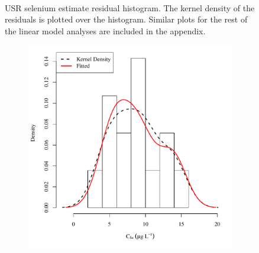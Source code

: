 \begin{landscape}
\begin{figure}
\begin{subfigure}{0.7\textwidth}
		\end{subfigure}\\
		\caption[USR selenium estimate residual histogram.]{USR selenium estimate residual histogram.  The kernel density of the residuals is plotted over the histogram.  Similar plots for the rest of the linear model analyses are included in the appendix.}
		\label{fig:concResHist_US}
	\end{figure}
\end{landscape}

\subfiguremid
\begin{landscape}
	\begin{figure}
		\begin{subfigure}{0.7\textwidth}
			\centering
			\includegraphics[width=\tableCustomSize]{"Figures/Results_USR/Stochastic/Conc Model ResDist U167"}
		\end{subfigure}%
		\begin{subfigure}{0.7\textwidth}
			\centering

\end{subfigure}
\end{figure}
\end{landscape}
